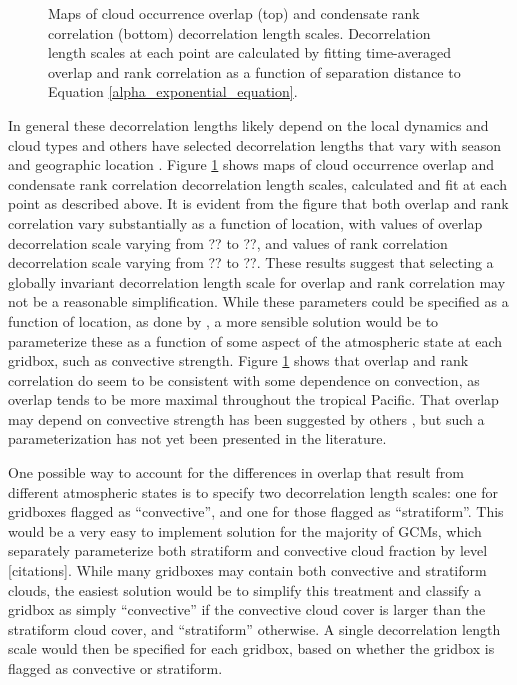 \begin{figure}
\centering
\caption{Maps of cloud occurrence overlap (top) and condensate rank correlation (bottom) decorrelation length scales. Decorrelation length scales at each point are calculated by fitting time-averaged overlap and rank correlation as a function of separation distance to Equation \ref{alpha_exponential_equation}.}
\label{sgi_overlap_map}
\end{figure}

In general these decorrelation lengths likely depend on the local dynamics and cloud types \citep[e.g.,][]{pincus_et_al_2005} and others have selected decorrelation lengths that vary with season and geographic location \citep[e.g.,][]{raisanen_et_al_2004, oreopoulos_et_al_2012}. Figure \ref{sgi_overlap_map} shows maps of cloud occurrence overlap and condensate rank correlation decorrelation length scales, calculated and fit at each point as described above. It is evident from the figure that both overlap and rank correlation vary substantially as a function of location, with values of overlap decorrelation scale varying from ?? to ??, and values of rank correlation decorrelation scale varying from ?? to ??. These results suggest that selecting a globally invariant decorrelation length scale for overlap and rank correlation may not be a reasonable simplification. While these parameters could be specified as a function of location, as done by \cite{oreopolous_et_al_2012}, a more sensible solution would be to parameterize these as a function of some aspect of the atmospheric state at each gridbox, such as convective strength. Figure \ref{sgi_overlap_map} shows that overlap and rank correlation do seem to be consistent with some dependence on convection, as overlap tends to be more maximal throughout the tropical Pacific. That overlap may depend on convective strength has been suggested by others \citep{pincus_et_al_2005}, but such a parameterization has not yet been presented in the literature.


One possible way to account for the differences in overlap that result from different atmospheric states is to specify two decorrelation length scales: one for gridboxes flagged as ``convective'', and one for those flagged as ``stratiform''. This would be a very easy to implement solution for the majority of GCMs, which separately parameterize both stratiform and convective cloud fraction by level [citations]. While many gridboxes may contain both convective and stratiform clouds, the easiest solution would be to simplify this treatment and classify a gridbox as simply ``convective'' if the convective cloud cover is larger than the stratiform cloud cover, and ``stratiform'' otherwise. A single decorrelation length scale would then be specified for each gridbox, based on whether the gridbox is flagged as convective or stratiform.

